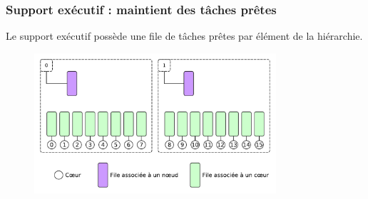 \documentclass[xcolor={usenames,dvipsnames,svgnames,table}, aspectratio=43]{beamer}
\begin{document}
\begin{frame}
\frametitle{Support exécutif : maintient des tâches prêtes}

  Le support exécutif possède une file de tâches prêtes par élément de la hiérarchie.

\begin{figure}
  \includegraphics[width=0.8\textwidth]{graph/hierarchical_queues.pdf}
\end{figure}
\end{frame}
\end{document}
